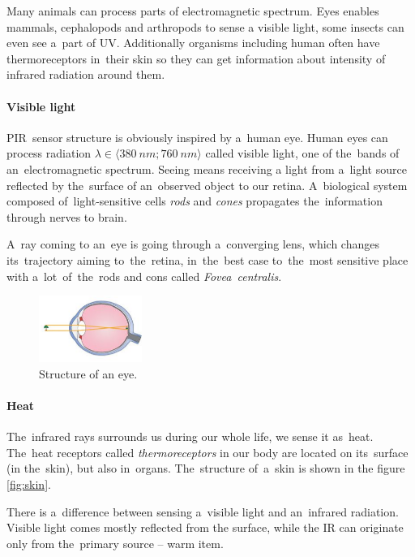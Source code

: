 Many animals can process parts of electromagnetic spectrum. Eyes enables mammals, cephalopods and arthropods
to sense a visible light, some insects can even see a~part of UV. Additionally organisms including human often
have thermoreceptors in~their skin so they can get information about intensity of infrared radiation around them.


\paragraph{Visible light}
\label{subsection:eye}
PIR~sensor structure is obviously inspired by a~human eye. Human eyes can process radiation
$\lambda \in \langle 380~nm;760~nm \rangle$ called visible light, one of the~bands of an~electromagnetic spectrum.
Seeing means receiving a light from a~light source reflected by the~surface of an~observed object to our retina.
A~biological system composed of~light-sensitive cells {\it rods} and {\it cones} propagates the~information
through nerves to brain.

A~ray coming to an~eye is going through a~converging lens, which changes its~trajectory aiming to~the~retina,
in~the~best case to~the~most sensitive place with a~lot~of~the~rods and cons called {\it Fovea~centralis}.
\cite{LightEyeVision}

\begin{figure}[h!]
\begin{center}
\includegraphics[width=0.3\textwidth]{img/eye.png}
\caption{Structure of an eye. \cite{Eye}\label{fig:eye}}
\end{center}    
\end{figure}


\paragraph{Heat}
The~infrared rays surrounds us during our whole life, we sense it as~heat. The~heat receptors called
{\it thermoreceptors} in our body are located on its~surface (in the~skin), but also in~organs.
The~structure of~a~skin is shown in the figure \ref{fig:skin}. 

There is a~difference between sensing a~visible light and an~infrared radiation. Visible light comes
mostly reflected from the surface, while the IR can originate only from the~primary source -- warm item.

